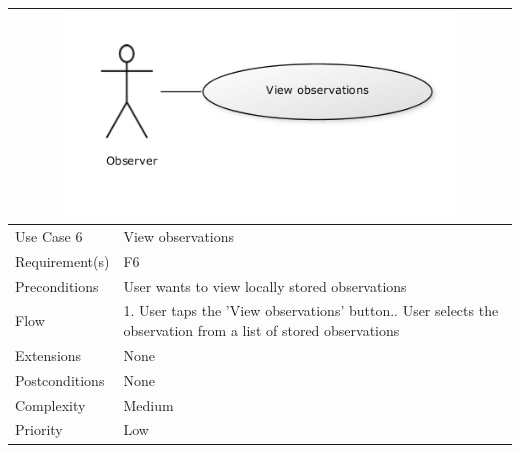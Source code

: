 \begin{tabular}[t]{|l|p{}|}
	\multicolumn{2}{c}{\includegraphics[width=0.8\textwidth]{reqspec/uc/viewobs.png}}\\\hline
	Use Case 6&View observations\\\hline
	Requirement(s)&F6\\\hline
	Preconditions&User wants to view locally stored observations\\\hline
	Flow&1. User taps the 'View observations' button.\newline
	2. User selects the observation from a list of stored observations \\\hline
	Extensions&None \\\hline
	Postconditions&None\\\hline
	Complexity&Medium\\\hline
	Priority&Low\\\hline
\end{tabular}

\hspace{2em}


